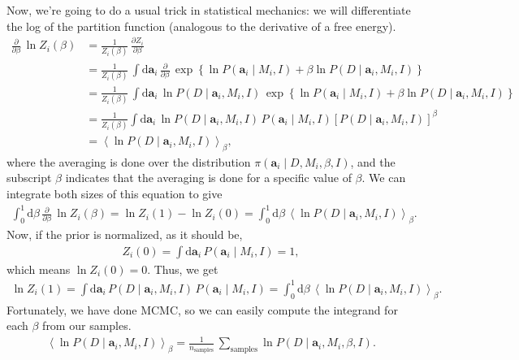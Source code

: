 Now, we're going to do a usual trick in statistical mechanics: we will
differentiate the log of the partition function (analogous to the
derivative of a free energy).
\begin{align}
\frac{\partial}{\partial \beta} \,\ln Z_i(\beta) &=
\frac{1}{Z_i(\beta)}\,\frac{\partial Z_i}{\partial \beta} \nonumber \\
&= \frac{1}{Z_i(\beta)}\,\int \mathrm{d}\mathbf{a}_i\, 
\frac{\partial}{\partial\beta}\,
\exp\left\{\ln P(\mathbf{a}_i\mid M_i, I) + \beta \ln P(D\mid \mathbf{a}_i, M_i, I)\right\} \nonumber \\
&= \frac{1}{Z_i(\beta)}\,\int \mathrm{d}\mathbf{a}_i\, \ln P(D\mid \mathbf{a}_i, M_i, I)\,
\exp\left\{\ln P(\mathbf{a}_i\mid M_i, I) + \beta \ln P(D\mid \mathbf{a}_i, M_i, I)\right\} \nonumber \\
&= \frac{1}{Z_i(\beta)}\int\mathrm{d}\mathbf{a}_i\,\ln P(D\mid \mathbf{a}_i, M_i, I)\,P(\mathbf{a}_i\mid M_i, I)\left[P(D\mid \mathbf{a}_i, M_i, I)\right]^\beta \nonumber \\
&= \left\langle \ln P(D\mid \mathbf{a}_i, M_i, I)\right\rangle_\beta,
\end{align}
where the averaging is done over the distribution
$\pi(\mathbf{a}_i\mid D, M_i, \beta, I)$, and the subscript $\beta$
indicates that the averaging is done for a specific value of $\beta$.
We can integrate both sizes of this equation to give
\begin{align}
\int_0^1 \mathrm{d}\beta\, \frac{\partial}{\partial \beta} \,\ln Z_i(\beta)
= \ln Z_i(1) - \ln Z_i(0) = \int_0^1\mathrm{d}\beta\,\left\langle \ln P(D\mid \mathbf{a}_i, M_i, I)\right\rangle_\beta.
\end{align}
Now, if the prior is normalized, as it should be,
\begin{align}
Z_i(0) = \int \mathrm{d}\mathbf{a}_i\,P(\mathbf{a}_i\mid M_i, I) = 1,
\end{align}
which means $\ln Z_i(0) = 0$.  Thus, we get
\begin{align}
\ln Z_i(1) = 
\int \mathrm{d}\mathbf{a}_i\,P(D\mid \mathbf{a}_i, M_i, I)\,
P(\mathbf{a}_i\mid M_i, I)
=
\int_0^1\mathrm{d}\beta\,\left\langle \ln P(D\mid \mathbf{a}_i, M_i, I)\right\rangle_\beta.
\end{align}
Fortunately, we have done MCMC, so we can easily compute the integrand
for each $\beta$ from our samples.
\begin{align}
\left\langle \ln P(D\mid \mathbf{a}_i, M_i, I)\right\rangle_\beta
= \frac{1}{n_\text{samples}}\,\sum_\text{samples} \ln P(D\mid \mathbf{a}_i, M_i, \beta, I).
\label{eq:ptmcmc_average}
\end{align}
